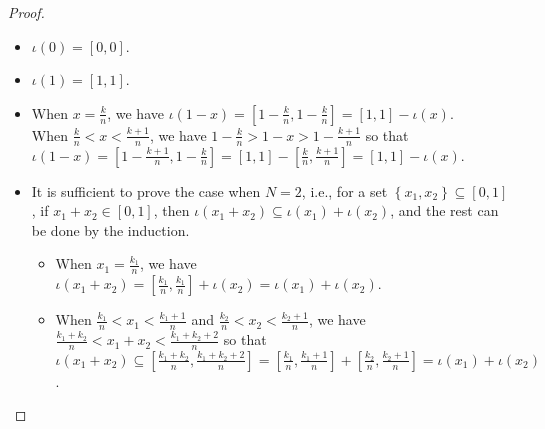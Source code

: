 \documentclass{article}
\theoremstyle{remark}
\begin{document}
\begin{proof}
~
\begin{itemize}
\item $\iota\left(0\right)=\left[0,0\right]$.
\item $\iota\left(1\right)=\left[1,1\right]$. 
\item When $x=\frac{k}{n}$, we have $\iota\left(1-x\right)=\left[1-\frac{k}{n},1-\frac{k}{n}\right]=\left[1,1\right]-\iota\left(x\right)$.\\
When $\frac{k}{n}<x<\frac{k+1}{n}$, we have $1-\frac{k}{n}>1-x>1-\frac{k+1}{n}$
so that $\iota\left(1-x\right)=\left[1-\frac{k+1}{n},1-\frac{k}{n}\right]=\left[1,1\right]-\left[\frac{k}{n},\frac{k+1}{n}\right]=\left[1,1\right]-\iota\left(x\right)$.
\item It is sufficient to prove the case when $N=2$, i.e., for a set $\left\{ x_{1},x_{2}\right\} \subseteq\left[0,1\right]$,
if $x_{1}+x_{2}\in\left[0,1\right]$, then $\iota\left(x_{1}+x_{2}\right)\subseteq\iota\left(x_{1}\right)+\iota\left(x_{2}\right)$,
and the rest can be done by the induction. 
\begin{itemize}
\item When $x_{1}=\frac{k_{1}}{n}$, we have $\iota\left(x_{1}+x_{2}\right)=\left[\frac{k_{1}}{n},\frac{k_{1}}{n}\right]+\iota\left(x_{2}\right)=\iota\left(x_{1}\right)+\iota\left(x_{2}\right)$.
\item When $\frac{k_{1}}{n}<x_{1}<\frac{k_{1}+1}{n}$ and $\frac{k_{2}}{n}<x_{2}<\frac{k_{2}+1}{n}$,
we have $\frac{k_{1}+k_{2}}{n}<x_{1}+x_{2}<\frac{k_{1}+k_{2}+2}{n}$
so that $\iota\left(x_{1}+x_{2}\right)\subseteq\left[\frac{k_{1}+k_{2}}{n},\frac{k_{1}+k_{2}+2}{n}\right]=\left[\frac{k_{1}}{n},\frac{k_{1}+1}{n}\right]+\left[\frac{k_{2}}{n},\frac{k_{2}+1}{n}\right]=\iota\left(x_{1}\right)+\iota\left(x_{2}\right)$.
\end{itemize}
\end{itemize}
\end{proof}
\end{document}

